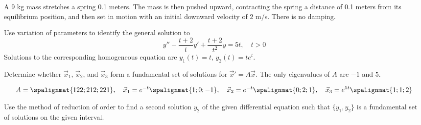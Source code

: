 \documentclass[12pt]{exam}
\begin{document}
\begin{questions}
    \question[11] A 9 kg mass stretches a spring 0.1 meters. The mass is then pushed upward, contracting the spring a distance of 0.1 meters from its equilibrium position, and then set in motion with an initial downward velocity of 2 m/s. There is no damping. 

    \newpage \InitialsLeft

    \question[8] Use variation of parameters to identify the general solution to $$y'' - \frac{t+2}{t}y' + \frac{t+2}{t^2}y = 5t, \quad t > 0$$ Solutions to the corresponding homogeneous equation are $y_1(t) = t$, $y_2(t) = te^t$. 
    
    
    \newpage \InitialsLeft
    
    \question[3] Determine whether $\vec x_1$, $\vec x_2$, and $\vec x_3$ form a fundamental set of solutions for $\vec x' = A\vec x$. The only eigenvalues of $A$ are $-1$ and $5$.
    
    $$A = \spalignmat{1 2 2;2 1 2;2 2 1}, \quad \vec x_1 = e^{-t}\spalignmat{1;0;-1}, \quad \vec x_2 = e^{-t}\spalignmat{0;2;1}, \quad \vec x_3 = e^{5t}\spalignmat{1;1;2} $$
    
    \vspace{5cm}
    
    \newpage \InitialsLeft
    
    \question[7] Use the method of reduction of order to ﬁnd a second solution $y_2$ of the given diﬀerential equation such that $\{ y_1 , y_2 \}$ is a fundamental set of solutions on the given interval.
    

\end{questions}
\end{document}
